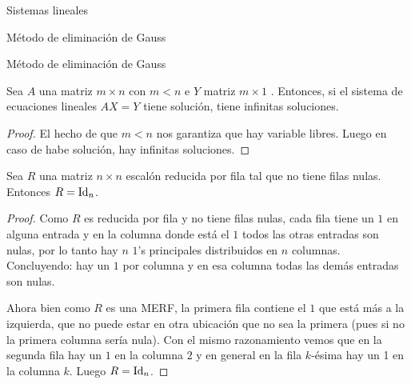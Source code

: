 \begin{chapter}{Sistemas lineales}
\begin{section}{Método de eliminación de Gauss }
\begin{subsection}{Método de eliminación de Gauss}
                \begin{corolario}\label{soluciones-m-menor-n}
                    Sea $A$ una matriz $m \times n$ con  $m < n$ e $Y$ matriz $m \times 1$ . Entonces, si el sistema de ecuaciones lineales $AX=Y$ tiene solución, tiene infinitas soluciones.
                \end{corolario}
                \begin{proof}
                   El hecho de que $m < n$  nos garantiza que hay variable libres. Luego en caso de habe solución, hay infinitas soluciones. 
                \end{proof}
                
                \begin{lema}\label{lem-mtrx-merf-id}
                    Sea $R$ una matriz $n \times n$ escalón reducida por fila tal que no tiene filas nulas. Entonces $R=\operatorname{Id}_n$. 
                \end{lema}
                \begin{proof}
                    Como  $R$ es reducida por fila y no tiene filas nulas, cada fila tiene  un $1$ en alguna entrada y en la columna donde está el $1$ todos las otras entradas son nulas, por  lo tanto hay $n$ $1$'s principales distribuidos en $n$ columnas. Concluyendo: hay un $1$ por columna y en esa columna todas las demás entradas son nulas. 
                    
                    Ahora bien como $R$ es una MERF, la primera fila contiene el $1$ que está más a la izquierda, que no puede estar en otra ubicación que no sea la primera (pues si no la primera columna sería nula). Con el mismo razonamiento vemos que en la segunda fila hay un $1$ en la columna $2$ y en general en la fila $k$-ésima hay un 1 en la columna $k$. Luego $R=\operatorname{Id}_n$.
                \end{proof}			
                

\end{subsection}
\end{section}
\end{chapter}
